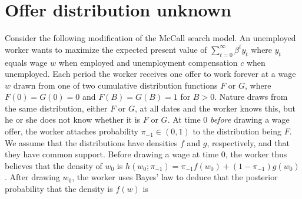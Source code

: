 


\section{Offer distribution unknown}\label{sec:Offer_distribution}%
Consider the following modification of the McCall search model.
An unemployed worker wants to maximize the expected present value of
$\sum_{t=0}^\infty \beta^t y_t$ where $y_t$ equals wage $w$ when employed and unemployment compensation $c$ when unemployed.
Each period the worker receives one  offer to work forever at a wage $w$ drawn  from one of two
 cumulative distribution functions $F$ or $G$, where $F(0)=G(0) = 0$ and $F(B) = G(B) = 1$ for $B > 0$.
Nature draws from the same distribution, either $F$ or $G$, at all dates and the worker knows this, but he or she does not know whether it is $F$ or $G$.
 At time $0$ {\it before\/} drawing a wage offer, the worker attaches probability $\pi_{-1} \in (0,1)$ to the distribution being
 $F$.  We assume that the distributions have densities $f$ and $g$, respectively, and that they have common support.
Before drawing a wage at time $0$, the  worker thus believes that the density of $w_0$
is $h(w_0;\pi_{-1}) = \pi_{-1} f(w_0) + (1-\pi_{-1}) g(w_0) $.  After drawing $w_0$, the worker uses Bayes' law to deduce that
the posterior  probability that the density is $f(w)$ is%

